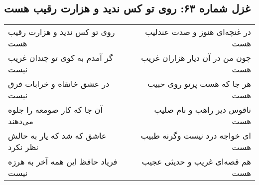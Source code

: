 \begin{center}
\section*{غزل شماره ۶۳: روی تو کس ندید و هزارت رقیب هست}
\label{sec:sh063}
\begin{longtable}{l p{0.5cm} r}
روی تو کس ندید و هزارت رقیب هست
&&
در غنچه‌ای هنوز و صدت عندلیب هست
\\
گر آمدم به کوی تو چندان غریب نیست
&&
چون من در آن دیار هزاران غریب هست
\\
در عشق خانقاه و خرابات فرق نیست
&&
هر جا که هست پرتو روی حبیب هست
\\
آن جا که کار صومعه را جلوه می‌دهند
&&
ناقوس دیر راهب و نام صلیب هست
\\
عاشق که شد که یار به حالش نظر نکرد
&&
ای خواجه درد نیست وگرنه طبیب هست
\\
فریاد حافظ این همه آخر به هرزه نیست
&&
هم قصه‌ای غریب و حدیثی عجیب هست
\\
\end{longtable}
\end{center}

